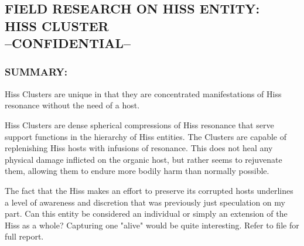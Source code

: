 \subsection*{FIELD RESEARCH ON HISS ENTITY:\\
	HISS CLUSTER\\
	--CONFIDENTIAL--}
\subsubsection*{SUMMARY:}
\par Hiss Clusters are unique in that they are
concentrated manifestations of Hiss
resonance without the need of a host.
\par Hiss Clusters are dense spherical
compressions of Hiss resonance that
serve support functions in the hierarchy of Hiss entities. The
Clusters are capable of replenishing Hiss hosts with infusions of
resonance. This does not heal any physical damage inflicted on
the organic host, but rather seems to rejuvenate them, allowing
them to endure more bodily harm than normally possible.
\par The fact that the Hiss makes an effort to preserve its corrupted
hosts underlines a level of awareness and discretion that was
previously just speculation on my part. Can this entity be
considered an individual or simply an extension of the Hiss as a
whole? Capturing one "alive" would be quite interesting.
Refer to file  for full report.